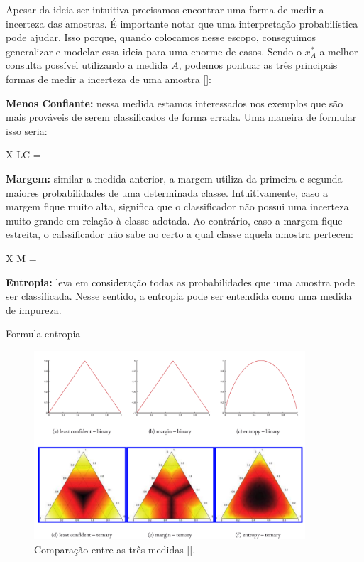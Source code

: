 Apesar da ideia ser intuitiva precisamos encontrar uma forma de medir a incerteza das amostras. É importante notar que uma interpretação probabilística pode ajudar. Isso porque, quando colocamos nesse escopo, conseguimos generalizar e modelar essa ideia para uma enorme de casos. Sendo o $x^*_{A}$ a melhor consulta possível utilizando a medida $A$, podemos pontuar as três principais formas de medir a incerteza de uma amostra [\cite{settles2014active}]:

\textbf{Menos Confiante:} nessa medida estamos interessados nos exemplos que são mais prováveis de serem classificados de forma errada. Uma maneira de formular isso seria:

X {LC} =  

\textbf{Margem:} similar a medida anterior, a margem utiliza da primeira e segunda maiores probabilidades de uma determinada classe. Intuitivamente, caso a margem fique muito alta, significa que o classificador não possui uma incerteza muito grande em relação à classe adotada. Ao contrário, caso a margem fique estreita, o calssificador não sabe ao certo a qual classe aquela amostra pertecen:

X M = 

\textbf{Entropia:} leva em consideração todas as probabilidades que uma amostra pode ser classificada. Nesse sentido, a entropia pode ser entendida como uma medida de impureza. 

Formula entropia

\begin{figure}
  \centering
  \includegraphics[width=0.9\textwidth]{figures/settles_2014_uncertainty_medidas.png}
  \caption{Comparação entre as três medidas [\cite{settles2014active}].}
  \label{fig:settles_2014_uncertainty_medidas}
\end{figure}



